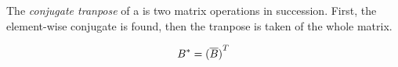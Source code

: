 \begin{definition}\label{def:Conjugate_Transpose}
  The \emph{conjugate tranpose} of a  is two matrix operations in succession.
  First, the element-wise conjugate is found, then the tranpose is taken of the whole matrix.

  \begin{equation}\label{eq:Conjugate_Tranpose}
    B^{*} = {(\overline{B})}^{T}
  \end{equation}
\end{definition}


